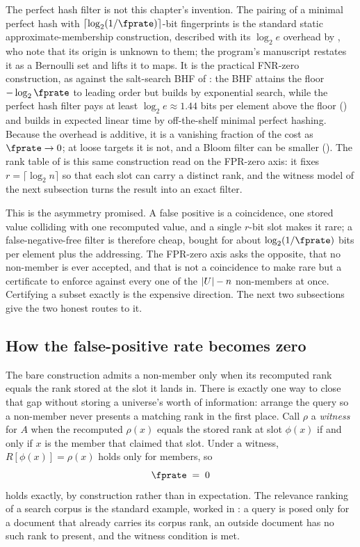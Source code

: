 The perfect hash filter is not this chapter's invention. The pairing of
a minimal perfect hash with $\lceil \log_2(1/\fprate) \rceil$-bit
fingerprints is the standard static approximate-membership construction,
described with its $\log_2 e$ overhead by
\textcite[Sec.~1]{dietzfelbinger-pagh-2008}, who note that its origin is
unknown to them; the program's manuscript \parencite{towell-bernoulli-phf}
restates it as a Bernoulli set and lifts it to maps. It is the practical
FNR-zero construction, as against the salt-search BHF of
: the BHF attains the floor $-\log_2 \fprate$ to leading
order but builds by exponential search, while the perfect hash filter
pays at least $\log_2 e \approx 1.44$ bits per element above the floor
() and builds in expected linear time by
off-the-shelf minimal perfect hashing. Because the overhead is additive,
it is a vanishing fraction of the cost as $\fprate \to 0$; at loose
targets it is not, and a Bloom filter can be smaller
(). The rank table of  is this
same construction read on the FPR-zero axis: it fixes $r = \lceil \log_2
n \rceil$ so that each slot can carry a distinct rank, and the witness
model of the next subsection turns the result into an exact filter.

This is the asymmetry  promised. A false positive
is a coincidence, one stored value colliding with one recomputed value,
and a single $r$-bit slot makes it rare; a false-negative-free filter is
therefore cheap, bought for about $\log_2(1/\fprate)$ bits per element
plus the addressing. The FPR-zero axis asks the opposite, that no
non-member is ever accepted, and that is not a coincidence to make rare
but a certificate to enforce against every one of the $|U| - n$
non-members at once. Certifying a subset exactly is the expensive
direction. The next two subsections give the two honest routes to it.

\subsection*{How the false-positive rate becomes zero}

The bare construction admits a non-member only when its recomputed rank
equals the rank stored at the slot it lands in. There is exactly one way
to close that gap without storing a universe's worth of information:
arrange the query so a non-member never presents a matching rank in the
first place. Call $\rho$ a \emph{witness} for $A$ when the recomputed
$\rho(x)$ equals the stored rank at slot $\phi(x)$ if and only if $x$ is
the member that claimed that slot. Under a witness, $R[\phi(x)] =
\rho(x)$ holds only for members, so
\[
  \fprate \;=\; 0
\]
holds exactly, by construction rather than in expectation. The relevance
ranking of a search corpus is the standard example, worked in
: a query is posed only for a document that
already carries its corpus rank, an outside document has no such rank to
present, and the witness condition is met.

